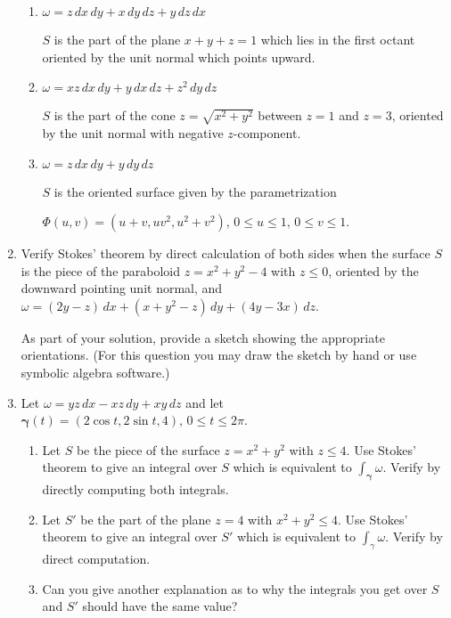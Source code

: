 \documentclass{article}
\begin{document}
\begin{enumerate}
\begin{enumerate}
        \item $\omega = z \, dx \, dy + x \, dy \, dz + y \, dz \, dx$

        $S$ is the part of the plane $x+y+z = 1$ which lies in the first octant oriented by the unit normal which points upward.

        \item $\omega  = xz \, dx \, dy + y \, dx \, dz + z^2 \, dy \, dz$

        $S$ is the part of the cone $z = \sqrt{x^2 + y^2}$ between $z=1$ and $z=3$,  oriented by the unit normal with negative $z$-component.

        \item $\omega = z \, dx \, dy + y \, dy \, dz$

        $S$ is the oriented surface given by the parametrization

        $\Phi (u,v) = (u+v, uv^2, u^2 + v^2),\, 0 \leq u \leq 1,\, 0\leq v \leq 1$.
    \end{enumerate}

    \newpage
    \item Verify Stokes' theorem by direct calculation of both sides when the surface $S$ is the piece of the paraboloid $z= x^2 + y^2 - 4$ with $z \leq 0$, oriented by the downward pointing unit normal, and $\omega = (2y-z)\, dx + (x + y^2 - z)\, dy + (4y-3x)\, dz$.

    As part of your solution, provide a sketch showing the appropriate orientations. (For this question you may draw the sketch by hand or use symbolic algebra software.)
    \newpage
    \item Let $\omega = yz\, dx - xz \, dy + xy \, dz$ and let $\boldsymbol \gamma(t) = (2\cos t, 2\sin t, 4),\, 0 \leq t \leq 2\pi$.
    \begin{enumerate}
        \item Let $S$ be the piece of the surface $z = x^2 + y^2$ with $z \leq 4$. Use Stokes' theorem to give an integral over $S$ which is equivalent to $\displaystyle \int_{\boldsymbol \gamma} \omega$. Verify by directly computing both integrals.
        \item Let $S'$ be the part of the plane $z=4$ with $x^2 + y^2 \leq 4$. Use Stokes' theorem to give an integral over $S'$ which is equivalent to $\displaystyle \int_{\gamma} \omega$. Verify by direct computation.
        
        \item Can you give another explanation as to why the integrals you get over $S$ and $S'$ should have the same value?


\end{enumerate}
\end{enumerate}
\end{document}
